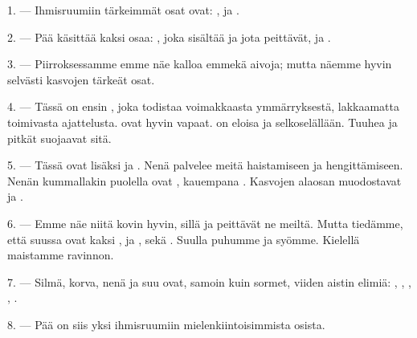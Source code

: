 
\VUsaut{4.0mm}
\VUsaut{2.0mm}

\VUsaut{2.4mm}
\VUsaut{3.0mm}

\VUsaut{3.0mm}

1. --- Ihmisruumiin tärkeimmät osat ovat: ,  ja
.

2. --- Pää käsittää kaksi osaa: , joka sisältää 
ja jota  peittävät, ja .

3. --- Piirroksessamme emme näe kalloa emmekä aivoja; mutta näemme hyvin
selvästi kasvojen tärkeät osat.

4. --- Tässä on ensin , joka todistaa voimakkaasta ymmärryksestä,
lakkaamatta toimivasta ajattelusta.  ovat hyvin vapaat.
 on eloisa ja selkoselällään. Tuuhea  ja pitkät
 suojaavat sitä.

5. --- Tässä ovat lisäksi  ja . Nenä palvelee
meitä haistamiseen ja hengittämiseen. Nenän kummallakin puolella ovat
, kauempana . Kasvojen alaosan muodostavat
 ja .

6. --- Emme näe niitä kovin hyvin, sillä  ja
 peittävät ne meiltä. Mutta tiedämme, että suussa ovat kaksi
,  ja  ,
sekä . Suulla puhumme ja syömme. Kielellä maistamme ravinnon.

7. --- Silmä, korva, nenä ja suu ovat, samoin kuin sormet, viiden aistin
elimiä: , , , ,
.

8. --- Pää on siis yksi ihmisruumiin mielenkiintoisimmista osista.

